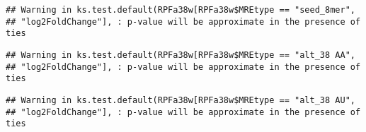 \documentclass[
]{article}
\newenvironment{Shaded}{\begin{snugshade}}{\end{snugshade}}
\newcommand{\FunctionTok}[1]{\textcolor[rgb]{0.13,0.29,0.53}{\textbf{#1}}}
\newcommand{\NormalTok}[1]{#1}
\newcommand{\OtherTok}[1]{\textcolor[rgb]{0.56,0.35,0.01}{#1}}
\newcommand{\SpecialCharTok}[1]{\textcolor[rgb]{0.81,0.36,0.00}{\textbf{#1}}}
\newcommand{\StringTok}[1]{\textcolor[rgb]{0.31,0.60,0.02}{#1}}
\begin{document}
\begin{verbatim}
## Warning in ks.test.default(RPFa38w[RPFa38w$MREtype == "seed_8mer",
## "log2FoldChange"], : p-value will be approximate in the presence of ties
\end{verbatim}

\begin{Shaded}
\end{Shaded}

\begin{verbatim}
## Warning in ks.test.default(RPFa38w[RPFa38w$MREtype == "alt_38 AA",
## "log2FoldChange"], : p-value will be approximate in the presence of ties
\end{verbatim}

\begin{Shaded}
\end{Shaded}

\begin{verbatim}
## Warning in ks.test.default(RPFa38w[RPFa38w$MREtype == "alt_38 AU",
## "log2FoldChange"], : p-value will be approximate in the presence of ties
\end{verbatim}
\end{document}
